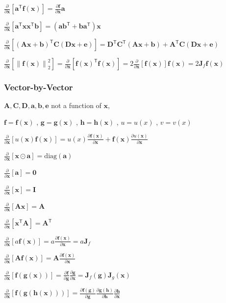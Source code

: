 \documentclass[a2paper,4pt]{extarticle}
\newcommand{\norm}[1]{\left\lVert #1 \right\rVert}
\newcommand*{\T}{\mathsf{T}}
\newcommand{\diag}{\text{diag}}
\newcommand{\mat}[1]{\mathbf{#1}}
\renewcommand{\vec}[1]{\mathbf{#1}}
\newcommand{\va}{\vec{a}}
\newcommand{\vb}{\vec{b}}
\newcommand{\ve}{\vec{e}}
\newcommand{\vf}{\vec{f}}
\newcommand{\vg}{\vec{g}}
\newcommand{\vh}{\vec{h}}
\newcommand{\vx}{\vec{x}}
\newcommand{\MA}{\mat{A}}
\newcommand{\MC}{\mat{C}}
\newcommand{\MD}{\mat{D}}
\newcommand{\MI}{\mat{I}}
\newcommand{\MJ}{\mat{J}}
\newcommand{\MO}{\mat{0}}
\begin{document}
\begin{landscape}
\begin{multicols*}{7}
\begin{multicols}{2}
$
\frac{\partial}{\partial \vx}
\left[\va^\T\vf(\vx)\right] 
= 
\frac{\partial \vf}{\partial \vx}
\va
$

$
\frac{\partial}{\partial \vx}
\left[\va^\T\vx\vx^\T\vb\right] 
= 
(\va\vb^\T+\vb\va^\T)\vx
$

\end{multicols}

$
\frac{\partial}{\partial \vx}
\left[
(\MA\vx+\vb)^\T\MC(\MD\vx+\ve)
\right] 
= 
\MD^\T\MC^\T(\MA\vx+\vb)
+
\MA^\T\MC(\MD\vx+\ve)
$


$
\frac{\partial}{\partial \vx}\left[\norm{\vf(\vx)}_2^2\right]
=
\frac{\partial}{\partial \vx}\left[\vf(\vx)^\T\vf(\vx)\right]
=
2\frac{\partial }{\partial\vx}\left[\vf(\vx)\right]\vf(\vx)
=
2\MJ_f\vf(\vx)
$

\subsubsection{Vector-by-Vector}

$\MA,\MC,\MD,\va,\vb,\ve$ not a function of $\vx$,

$\vf=\vf(\vx)$
, $\vg=\vg(\vx)$
, $\vh=\vh(\vx)$
, $u=u(x)$
, $v=v(x)$

$
\frac{\partial}{\partial \vx}
\left[
u(\vx)\vf(\vx)
\right] 
= 
u(x)
\frac{\partial \vf(\vx)}{\partial\vx}
+
\vf(\vx)
\frac{\partial u(\vx)}{\partial\vx}
$
\begin{multicols*}{2}
$\frac{\partial }{\partial\vx}\left[\vx\odot\va\right]=\diag(\va)$

$
\frac{\partial}{\partial \vx}
\left[\va\right] 
=
\MO
$

$
\frac{\partial}{\partial \vx}
\left[\vx\right] 
=
\MI
$

$
\frac{\partial}{\partial \vx}
\left[\MA\vx\right] 
= 
\MA
$

$
\frac{\partial}{\partial \vx}
\left[\vx^\T\MA\right] 
= 
\MA^\T
$

$
\frac{\partial}{\partial \vx}
\left[
a\vf(\vx)
\right] 
= 
a
\frac{\partial \vf(\vx)}{\partial\vx}
=
a\MJ_f
$

$
\frac{\partial}{\partial \vx}
\left[
\MA\vf(\vx)
\right] 
= 
\MA\frac{\partial \vf(\vx)}{\partial \vx}
$

$
\frac{\partial}{\partial \vx}
\left[
\vf(\vg(\vx))
\right] 
= 
\frac{\partial \vf}{\partial \vg}
\frac{\partial \vg}{\partial \vx}
=
\MJ_f(\vg)\MJ_g(\vx)
$

$
\frac{\partial}{\partial \vx}
\left[
\vf(\vg(\vh(\vx)))
\right] 
= 
\frac{\partial \vf(\vg)}{\partial \vg}
\frac{\partial \vg(\vh)}{\partial \vh}
\frac{\partial \vh}{\partial \vx}
$
\end{multicols*}


\end{multicols*}
\end{landscape}
\end{document}
